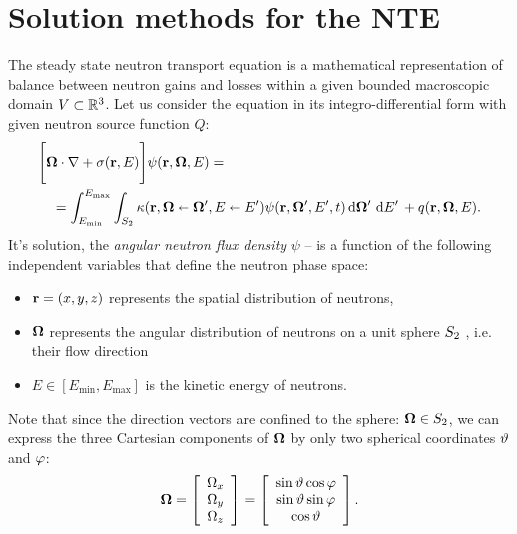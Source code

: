 \chapter{Solution methods for the NTE}\label{chap:nte-review}


The steady state neutron transport equation is a mathematical representation of balance between neutron gains and losses
within a given bounded macroscopic domain $\VV\subset\R[3]$. Let us consider the equation in its integro-differential
form with given neutron source function $Q$:
\begin{equation}\label{eq1}
  \begin{multlined}
    \Biggl[
      \bomega\cdot\grad + \sigma(\br,E)
    \Biggr]
    \psi(\br,\bomega,E) =\\
    = \intE[']{\Emin}{\Emax}{\intA[']{\kappa(\br,\bomega\sla\bomega',E\sla E')\psi(\br,\bomega',E',t)}}  + 
    \src(\br,\bomega,E).
  \end{multlined}  
\end{equation}
It's solution, the \textit{angular neutron flux density} $\psi$ -- is a function of the following independent variables
that define the neutron phase space:
\begin{itemize}
 	\item $\br = (x,y,z)$
 	 represents the spatial distribution of
 	 neutrons,
 	\item $\bomega$ represents the angular
 	distribution of neutrons on a unit sphere $\Sphere$ , i.e. their flow direction
 	\item $E\in [E_{\text{min}},E_{\text{max}}]$ is the kinetic
 	energy of neutrons.
\end{itemize}
Note that since the direction vectors are confined to the sphere: $\bomega\in\Sphere$, we can express the three
Cartesian components of $\bomega$ by only two spherical coordinates $\polar$ and
$\azimuthal$: 
\begin{equation*}
	\bomega = \left[\begin{array}{c}
		\Omega_x \\
		\Omega_y \\
		\Omega_z
	\end{array}\right] = \left[\begin{array}{c}
		\sint\cosp \\
		\sint\sinp \\
		\cost
	\end{array}\right].
\end{equation*}

